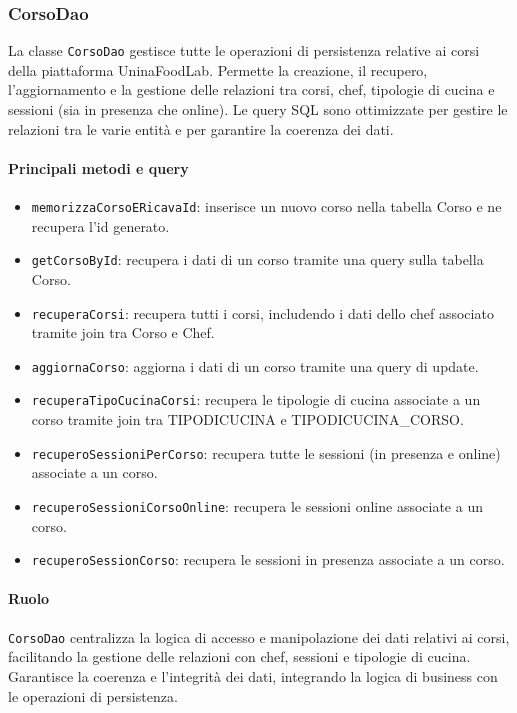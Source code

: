 \subsubsection{CorsoDao}
La classe \texttt{CorsoDao} gestisce tutte le operazioni di persistenza relative ai corsi della piattaforma UninaFoodLab. Permette la creazione, il recupero, l'aggiornamento e la gestione delle relazioni tra corsi, chef, tipologie di cucina e sessioni (sia in presenza che online). Le query SQL sono ottimizzate per gestire le relazioni tra le varie entità e per garantire la coerenza dei dati.

\paragraph{Principali metodi e query}
\begin{itemize}
    \item \texttt{memorizzaCorsoERicavaId}: inserisce un nuovo corso nella tabella Corso e ne recupera l'id generato.
    \item \texttt{getCorsoById}: recupera i dati di un corso tramite una query sulla tabella Corso.
    \item \texttt{recuperaCorsi}: recupera tutti i corsi, includendo i dati dello chef associato tramite join tra Corso e Chef.
    \item \texttt{aggiornaCorso}: aggiorna i dati di un corso tramite una query di update.
    \item \texttt{recuperaTipoCucinaCorsi}: recupera le tipologie di cucina associate a un corso tramite join tra TIPODICUCINA e TIPODICUCINA\_CORSO.
    \item \texttt{recuperoSessioniPerCorso}: recupera tutte le sessioni (in presenza e online) associate a un corso.
    \item \texttt{recuperoSessioniCorsoOnline}: recupera le sessioni online associate a un corso.
    \item \texttt{recuperoSessionCorso}: recupera le sessioni in presenza associate a un corso.
\end{itemize}

\paragraph{Ruolo}
\texttt{CorsoDao} centralizza la logica di accesso e manipolazione dei dati relativi ai corsi, facilitando la gestione delle relazioni con chef, sessioni e tipologie di cucina. Garantisce la coerenza e l'integrità dei dati, integrando la logica di business con le operazioni di persistenza.

